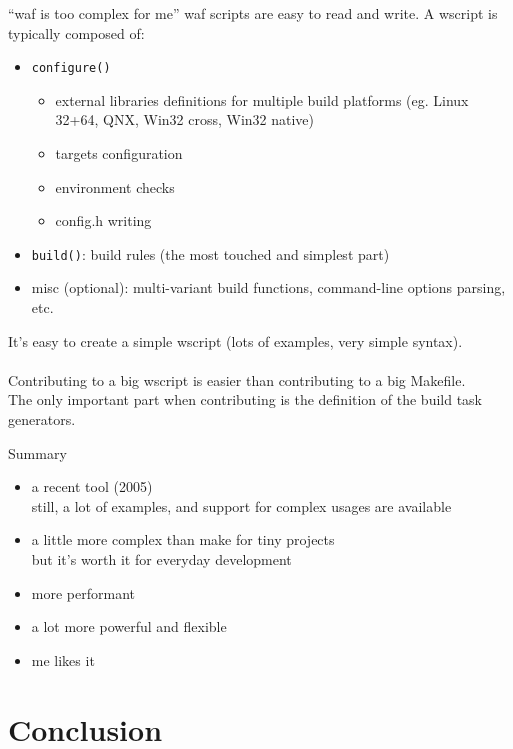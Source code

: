 \documentclass[xetex]{beamer}
\begin{document}
\begin{frame}{“waf is too complex for me”}
	waf scripts are easy to read and write.
	A wscript is typically composed of:
	\begin{itemize}
		\item \texttt{configure()}
		\begin{itemize}
			\scriptsize
			\item external libraries definitions for multiple build platforms (eg. Linux 32+64, QNX, Win32 cross, Win32 native)
			\item targets configuration
			\item environment checks
			\item config.h writing
		\end{itemize}
		\item \texttt{build()}: build rules (the most touched and simplest part)
		\item misc (optional): multi-variant build functions, command-line options parsing, etc.
	\end{itemize}

	It's easy to create a simple wscript (lots of examples, very simple syntax).
	\\
	~\\
	Contributing to a big wscript is easier than contributing to a big Makefile.
	\\
	The only important part when contributing is the definition of the build task generators.
\end{frame}


\begin{frame}{Summary}
	\begin{itemize}
		\item a recent tool (2005)\\
		still, a lot of examples, and support for complex usages are available
		\item a little more complex than make for tiny projects\\
		but it's worth it for everyday development
		\item more performant
		\item a lot more powerful and flexible
		\item me likes it
	\end{itemize}
\end{frame}

\section{Conclusion}
\end{document}
